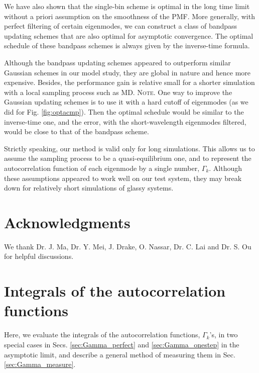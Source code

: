 \documentclass[reprint, floatfix]{revtex4-1}
\newcommand{\note}[1]{{\color{DarkGreen}\footnotesize \textsc{Note.} #1}}
\begin{document}
We have also shown that
the single-bin scheme is optimal
in the long time limit
without a priori assumption
on the smoothness of the PMF.
%
More generally, with perfect filtering
of certain eigenmodes, we can construct a
class of bandpass updating schemes
that are also optimal for asymptotic convergence.
%
The optimal schedule of these bandpass schemes
is always given by the inverse-time formula.

Although the bandpass updating schemes
appeared to outperform similar Gaussian schemes
in our model study,
they are global in nature
and hence more expensive.
%
Besides, the performance gain
is relative small for a shorter simulation
with a local sampling process such as MD.
%
\note{
One way to improve the Gaussian updating schemes
is to use it with a hard cutoff of eigenmodes
(as we did for Fig. \ref{fig:optacmp}).
%
Then the optimal schedule
would be similar to the inverse-time one,
and the error, with the short-wavelength eigenmodes filtered,
would be close to that of the bandpass scheme.
}



Strictly speaking, our method is valid
only for long simulations.
%
This allows us to assume the sampling process
to be a quasi-equilibrium one,
and to represent the autocorrelation function
of each eigenmode by a single number, $\Gamma_k$.
%
Although these assumptions appeared to work well
on our test system,
they may break down for relatively short simulations
of glassy systems.



\section{Acknowledgments}

We thank Dr. J. Ma, Dr. Y. Mei,
J. Drake, O. Nassar, Dr. C. Lai and Dr. S. Ou
for helpful discussions.


\appendix


\section{\label{sec:Gamma}
Integrals of the autocorrelation functions}



Here, we evaluate the integrals of
the autocorrelation functions,
$\Gamma_k$'s,
in two special cases
in Secs. \ref{sec:Gamma_perfect}
and \ref{sec:Gamma_onestep}
in the asymptotic limit,
and describe a general method of measuring them
in Sec. \ref{sec:Gamma_measure}.
\end{document}
